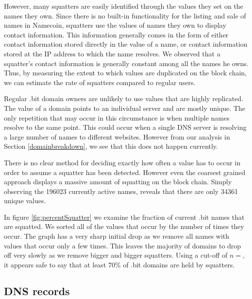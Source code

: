 However, many squatters are easily identified through the values they set on the names they own. Since there is no built-in functionality for the listing and sale of names in Namecoin, squatters use the values of names they own to display contact information. This information generally comes in the form of either contact information stored directly in the value of a name, or contact information stored at the IP address to which the name resolves.  We observed that a squatter's contact information is generally constant among all the names he owns. Thus, by measuring the extent to which values are duplicated on the block chain, we can estimate the rate of squatters compared to regular users.

Regular .bit domain owners are unlikely to use values that are highly replicated. The value of a domain points to an individual server and are mostly unique. The only repetition that may occur in this circumstance is when multiple names resolve to the same point. This could occur when a single DNS server is resolving a large number of names to different websites. However from our analysis in Section \ref{domainbreakdown}, we see that this does not happen currently.

There is no clear method for deciding exactly how often a value has to occur in order to assume a squatter has been detected. However even the coarsest grained approach displays a massive amount of squatting on the block chain. Simply observing the 196023 currently active names, reveals that there are only 34361 unique values.

In figure \ref{fig:percentSquatter} we examine the fraction of current .bit names that are squatted. We sorted all of the values that occur by the number of times they occur. 
The graph has a very sharp initial drop as we remove all names with values that occur only a few times. This leaves the majority of domains to drop off very slowly as we remove bigger and bigger squatters. Using a cut-off of $n=$\hi{[fill in]}, it appears safe to say that at least 70\% of .bit domains are held by squatters.

\subsection{DNS records}


